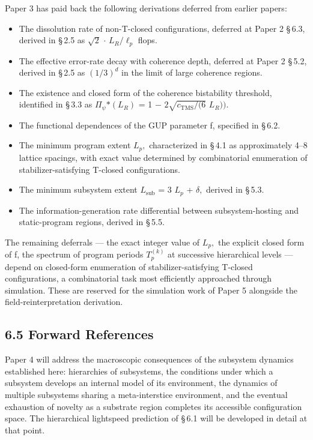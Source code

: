 \documentclass[11pt,oneside]{report}
\theoremstyle{definition}
\theoremstyle{remark}
\begin{document}
Paper 3 has paid back the following derivations deferred from earlier
papers:

\begin{itemize}
\item
  The dissolution rate of non-T-closed configurations, deferred at Paper
  2 \S\,6.3, derived in \S\,2.5 as \ensuremath{\sqrt{2}} \ensuremath{\cdot} \ensuremath{L_{R}/\ell_{p}} flops.
\item
  The effective error-rate decay with coherence depth, deferred at Paper
  2 \S\,5.2, derived in \S\,2.5 as \ensuremath{(1/3)^{d}} in the limit of large coherence
  regions.
\item
  The existence and closed form of the coherence bistability threshold,
  identified in \S\,3.3 as \textbar \ensuremath{\Pi_{\psi}}\textbar\ensuremath{*(L_{R})} = 1 \ensuremath{-} \ensuremath{2\sqrt{c_{\mathrm{TMS}}/(6}}
  \ensuremath{L_{R})).}
\item
  The functional dependences of the GUP parameter f, specified in \S\,6.2.
\item
  The minimum program extent \ensuremath{L_{p},} characterized in \S\,4.1 as
  approximately 4--8 lattice spacings, with exact value determined by
  combinatorial enumeration of stabilizer-satisfying T-closed
  configurations.
\item
  The minimum subsystem extent \ensuremath{L_{\mathrm{sub}}} = 3 \ensuremath{L_{p}} + \ensuremath{\delta ,} derived in \S\,5.3.
\item
  The information-generation rate differential between subsystem-hosting
  and static-program regions, derived in \S\,5.5.
\end{itemize}

The remaining deferrals --- the exact integer value of \ensuremath{L_{p},} the
explicit closed form of f, the spectrum of program periods \ensuremath{T_{p}^{(k)}}
at successive hierarchical levels --- depend on closed-form enumeration
of stabilizer-satisfying T-closed configurations, a combinatorial task
most efficiently approached through simulation. These are reserved for
the simulation work of Paper 5 alongside the field-reinterpretation
derivation.

\subsection*{6.5 Forward References}

Paper 4 will address the macroscopic consequences of the subsystem
dynamics established here: hierarchies of subsystems, the conditions
under which a subsystem develops an internal model of its environment,
the dynamics of multiple subsystems sharing a meta-interstice
environment, and the eventual exhaustion of novelty as a substrate
region completes its accessible configuration space. The hierarchical
lightspeed prediction of \S\,6.1 will be developed in detail at that point.
\end{document}
